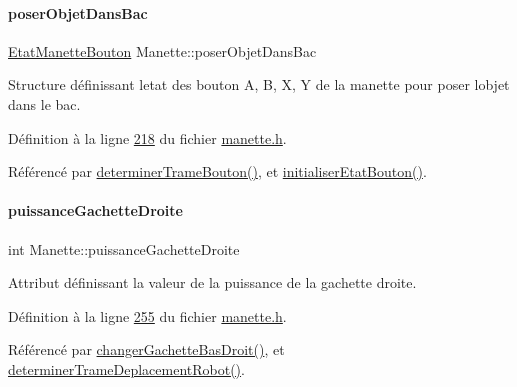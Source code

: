 \paragraph{\texorpdfstring{poser\+Objet\+Dans\+Bac}{poserObjetDansBac}}
{\footnotesize\ttfamily \hyperlink{struct_etat_manette_bouton}{Etat\+Manette\+Bouton} Manette\+::poser\+Objet\+Dans\+Bac\hspace{0.3cm}{\ttfamily [private]}}



Structure définissant l\textquotesingle{}etat des bouton A, B, X, Y de la manette pour poser l\textquotesingle{}objet dans le bac. 



Définition à la ligne \hyperlink{manette_8h_source_l00218}{218} du fichier \hyperlink{manette_8h_source}{manette.\+h}.



Référencé par \hyperlink{manette_8cpp_source_l00393}{determiner\+Trame\+Bouton()}, et \hyperlink{manette_8cpp_source_l00313}{initialiser\+Etat\+Bouton()}.

\mbox{\label{class_manette_a135a3a6f567bbeeefd69b3a020f9f040}} 
\paragraph{\texorpdfstring{puissance\+Gachette\+Droite}{puissanceGachetteDroite}}
{\footnotesize\ttfamily int Manette\+::puissance\+Gachette\+Droite\hspace{0.3cm}{\ttfamily [private]}}



Attribut définissant la valeur de la puissance de la gachette droite. 



Définition à la ligne \hyperlink{manette_8h_source_l00255}{255} du fichier \hyperlink{manette_8h_source}{manette.\+h}.



Référencé par \hyperlink{manette_8cpp_source_l00504}{changer\+Gachette\+Bas\+Droit()}, et \hyperlink{manette_8cpp_source_l00341}{determiner\+Trame\+Deplacement\+Robot()}.

\mbox{\label{class_manette_ab777328c9b35454ab45ed5e0b0a5f234}} 
